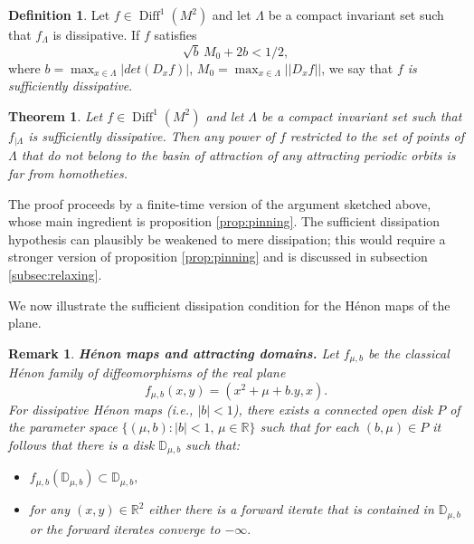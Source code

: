 \documentclass[a4paper,11pt]{article}
\newtheorem{theorem}{Theorem}
\newtheorem{remark}[lemma]{Remark}
\theoremstyle{definition}
\newtheorem{definition}[lemma]{Definition}
\def\DD{{\mathbb D}}
\def\RR{{\mathbb R}}
\def\La{\Lambda}
\def\La{\Lambda}
\def\diff{\operatorname{Diff}}
\begin{document}
\begin{definition} Let $f\in \diff^1(M^2)$ and let $\La$ be a compact invariant set such that $f_{\La}$ is dissipative. If $f$ satisfies  
\begin{equation}\label{cond-diss-FFH}
   \sqrt{b}\,M_0 + 2b  <1/2,
\end{equation}where $b=\max_{x\in \La}|det(D_xf)|$, $M_0=\max_{x\in \La}||D_xf||$, we  say that {\it $f$ is sufficiently dissipative}.
    
\end{definition}


\begin{theorem}\label{dissipative-FFH} 
Let $f\in \diff^1(M^2)$ and let $\La$ be a compact invariant set such that
$f_{|\La}$ is sufficiently dissipative. Then any power of  $f$ restricted to the set of
points of $\La$ that do not belong to the basin of attraction of any
attracting periodic orbits is  far from homotheties. 
\end{theorem} 


The proof proceeds by a finite-time version of the argument sketched above, whose main ingredient is proposition \ref{prop:pinning}. The sufficient dissipation hypothesis can plausibly be weakened to mere dissipation; this would require a stronger version of proposition \ref{prop:pinning} and is discussed in subsection \ref{subsec:relaxing}. 

We now illustrate the sufficient dissipation condition for the  H\'enon maps of the plane.

\begin{remark}\label{Henon-diss}{\bf H\'enon maps and attracting domains. } Let $f_{\mu,b}$ be the classical H\'enon family of diffeomorphisms of the   real plane $$f_{\mu, b}(x,y)=(x^2+\mu+b.y,x).$$ For dissipative H\'enon maps (i.e., $|b|<1$), there exists a connected open disk  $P$ of the parameter space $\{(\mu,b): |b|<1,\, \mu\in \RR\}$ such that for each $(b, \mu)\in P$ it follows that there is a disk $\DD_{\mu,b}$ such that:

\begin{itemize}
    \item[--] $f_{\mu,b}(\DD_{\mu, b})\subset \DD_{\mu,b},$
    \item for any $(x,y)\in \RR^2$ either there is a forward iterate that is contained in $\DD_{\mu,b}$ or the forward iterates converge to $-\infty.$ 
\end{itemize}
    
\end{remark}
\end{document}
